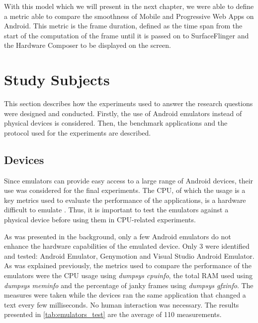 \documentclass{kththesis}
\begin{document}
With this model which we will present in the next chapter, we were able to define a metric able to compare the smoothness of Mobile and Progressive Web Apps on Android. This metric is the frame duration, defined as the time span from the start of the computation of the frame until it is passed on to SurfaceFlinger and the Hardware Composer to be displayed on the screen.

\section{Study Subjects}

This section describes how the experiments used to answer the research questions were designed and conducted. Firstly, the use of Android emulators instead of physical devices is considered. Then, the benchmark applications and the protocol used for the experiments are described.

\subsection{Devices}
\label{method:emulators}

Since emulators can provide easy access to a large range of Android devices, their use was considered for the final experiments. The CPU, of which the usage is a key metrics used to evaluate the performance of the applications, is a hardware difficult to emulate \cite{cpu_emulator}. Thus, it is important to test the emulators against a physical device before using them in CPU-related experiments.

As was presented in the background, only a few Android emulators do not enhance the hardware capabilities of the emulated device. Only 3 were identified and tested: Android Emulator, Genymotion and Visual Studio Android Emulator. As was explained previously, the metrics used to compare the performance of the emulators were the CPU usage using \textit{dumpsys cpuinfo}, the total RAM used using \textit{dumpsys meminfo} and the percentage of janky frames using \textit{dumpsys gfxinfo}. The measures were taken while the devices ran the same application that changed a text every few milliseconds. No human interaction was necessary. The results presented in \autoref{tab:emulators_test} are the average of 110 measurements.
\end{document}
